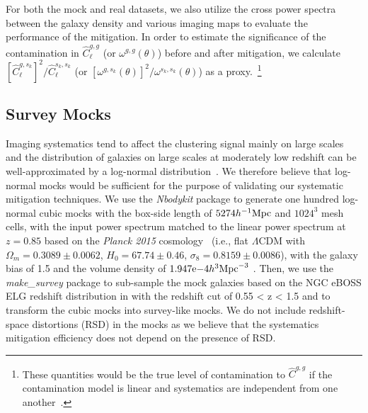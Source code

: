 \documentclass[fleqn, usenatbib]{mnras}
\begin{document}
\begin{itemize}
    For both the mock and real datasets, we also utilize the cross power spectra between the galaxy density and various imaging maps to evaluate the performance of the  mitigation. In order to estimate the significance of the contamination in $\hat{C}^{g,g}_{\ell}$ (or $\omega^{g,g} (\theta)$) before and after mitigation, we calculate $[\hat{C}^{g,s_k}_{\ell}]^2/\hat{C}^{s_k,s_k}_{\ell}$ (or $[\omega^{g,s_k}(\theta)]^2/\omega^{s_k,s_k}(\theta)$) as a proxy.~\footnote{These quantities would be the true level of contamination to $\hat{C}^{g,g}$ if the contamination model is linear and systematics are independent from one another~\citep{ashley2012MNRAS,2012ApJ...761...14H}.}
\end{itemize}

\def\ihMpc{h^{-1}{\rm Mpc}}
\def\trihMpc{h^{3}{\rm Mpc}^{-3}}
\subsection{Survey Mocks}\label{subsec:surveymocks}
Imaging systematics tend to affect the clustering signal mainly on large scales \citep{myers2007clustering, huterer2013calibration} and the distribution of galaxies on large scales at moderately low redshift can be well-approximated by a log-normal distribution~\citep{1991MNRAS.248....1C}. We therefore believe that log-normal mocks would be sufficient for the purpose of validating our systematic mitigation techniques. We use the \textit{Nbodykit} package \citep{hand2017nbodykit} to generate one hundred log-normal cubic mocks with the box-side length of $5274 \ihMpc$ and $1024^3$ mesh cells, with the input power spectrum matched to the linear power spectrum  at $z=0.85$ based on the \textit{Planck 2015} cosmology~\citep{ade2016planck} (i.e., flat $\Lambda$CDM with $\Omega_m=0.3089 \pm 0.0062$, $H_{0}=67.74 \pm 0.46$, $\sigma_8 = 0.8159 \pm 0.0086$), with the galaxy bias of 1.5 and the volume density of $1.947\mathrm{e}{-4}\trihMpc$ \citep[see e.g.][]{Raichoor2017MNRAS.471.3955R}. Then, we use the \textit{make\_survey} package \citep{white2013mock} to sub-sample the mock galaxies based on the NGC eBOSS ELG redshift distribution in \citet{Raichoor2017MNRAS.471.3955R} with the redshift cut of  0.55 < z < 1.5 and to transform the cubic mocks into survey-like mocks. We do not include redshift-space distortions (RSD) in the mocks as we believe that the systematics mitigation efficiency does not depend on  the presence of RSD.\\
\end{document}
